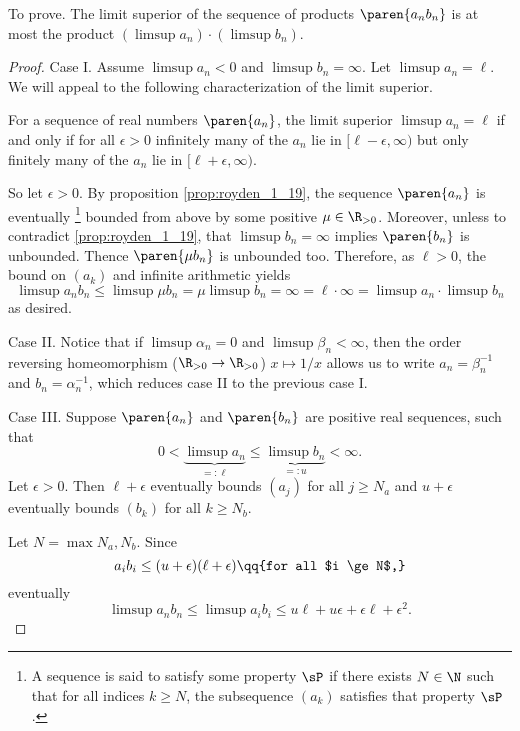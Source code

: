 \documentclass[onesided]{ccg-pset}
\begin{document}
\begin{enumerate}
To prove. The limit superior of the sequence of products $\paren{a_n b_n}$ is at most the product $(\limsup a_n)\cdot(\limsup b_n)$.

\begin{proof}
Case I. Assume $\limsup a_n < 0$ and $\limsup b_n = \infty$. Let $\limsup a_n = \ell$. We will appeal to the following characterization of the limit superior.

\begin{prop}
    \label{prop:royden_1_19}
    For a sequence of real numbers $\paren{a_n}$, the limit superior $\limsup a_n = \ell$ if and only if for all $\epsilon > 0$ infinitely many of the $a_n$ lie in $[\ell - \epsilon, \infty)$ but only finitely many of the $a_n$ lie in $[\ell + \epsilon, \infty)$.
\end{prop}

    So let $\epsilon > 0$.  By proposition \ref{prop:royden_1_19}, the sequence $\paren{a_n}$ is eventually%
    \footnote{%
A sequence is said to  satisfy some property $\sP$ if there exists $N \in \N$ such that for all indices $k \ge N$, the subsequence $(a_k)$ satisfies that property $\sP$.%
    }
    bounded from above by some positive $\mu \in \R_{>0}$. Moreover, unless to contradict \ref{prop:royden_1_19}, that $\limsup b_n = \infty$ implies $\paren{b_n}$ is unbounded. Thence $\paren{\mu b_n}$ is unbounded too. Therefore, as $\ell > 0$, the bound on $(a_k)$ and infinite arithmetic yields
    \begin{equation*}
        \limsup a_nb_n \le \limsup \mu b_n = \mu \limsup b_n = \infty = \ell \cdot \infty = \limsup a_n \cdot \limsup b_n
    \end{equation*}
    as desired.

    Case II. Notice that if $\limsup \alpha_n = 0$ and $\limsup \beta_n < \infty$, then the order reversing homeomorphism ($\R_{>0} \to \R_{>0}$) $x \mapsto 1/x$ allows us to write $a_n = \beta_n^{-1}$ and $b_n= \alpha_n^{-1}$, which reduces case II to the previous case I.

Case III.  Suppose $\paren{a_n}$ and $\paren{b_n}$ are positive real sequences, such that 
\begin{equation*}
    0 < \underbrace{\limsup a_n}_{=:\ell} \le \underbrace{\limsup b_n}_{=:u} < \infty.
\end{equation*}
Let $\epsilon > 0$. Then $\ell + \epsilon$ eventually bounds $(a_j)$ for all $j \ge N_a$ and $u + \epsilon$ eventually bounds $(b_k)$ for all $k \ge N_b$. 

    Let $N = \max{N_a, N_b}$. Since 
\begin{equation*}
    a_i b_i \le (u + \epsilon)(\ell + \epsilon) \qq{for all $i \ge N$,}
\end{equation*}
eventually
\begin{equation*}
\limsup a_n b_n \le \limsup a_i b_i \le u\ell + u\epsilon + \epsilon\ell + \epsilon^2.
\end{equation*}


\end{proof}
\end{enumerate}
\end{document}

